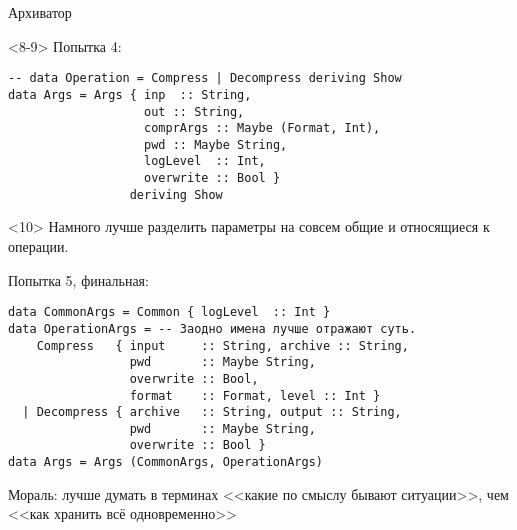 \begin{frame}[t,fragile]{Архиватор}
\begin{onlyenv}<8-9>
Попытка 4:
\begin{verbatim}
-- data Operation = Compress | Decompress deriving Show
data Args = Args { inp  :: String,
                   out :: String,
                   comprArgs :: Maybe (Format, Int),
                   pwd :: Maybe String,
                   logLevel  :: Int,
                   overwrite :: Bool }
                 deriving Show
\end{verbatim}
\end{onlyenv}

\begin{onlyenv}<10>
Намного лучше разделить параметры на совсем общие и относящиеся к операции.

Попытка 5, финальная:
\begin{verbatim}
data CommonArgs = Common { logLevel  :: Int }
data OperationArgs = -- Заодно имена лучше отражают суть.
    Compress   { input     :: String, archive :: String,
                 pwd       :: Maybe String,
                 overwrite :: Bool,
                 format    :: Format, level :: Int }
  | Decompress { archive   :: String, output :: String,
                 pwd       :: Maybe String,
                 overwrite :: Bool }
data Args = Args (CommonArgs, OperationArgs)
\end{verbatim}
Мораль: лучше думать в терминах <<какие по смыслу бывают ситуации>>, чем
<<как хранить всё одновременно>>
\end{onlyenv}
\end{frame}

